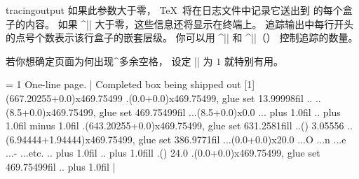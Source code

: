 \begindesc
\cts tracingoutput {}
\explain
如果此参数大于零，
\TeX\ 将在日志文件中记录它送出到 \dvifile 的每个盒子的内容。
如果 ^|\tracingonline| 大于零，这些信息还将显示在终端上。
追踪输出中每行开头的点号个数表示该行盒子的嵌套层级。
你可以用 ^|\showboxbreadth| 和 ^|\showboxdepth|（\xref\showboxbreadth ）%
控制追踪的数量。

若你想确定页面为何出现^{多余空格}，
设定 |\tracingoutput| 为 $1$ 就特别有用。

\example
\tracingoutput = 1 \nopagenumbers
One-line page. \bye
|
\logproduces
Completed box being shipped out [1]
\vbox(667.20255+0.0)x469.75499
.\vbox(0.0+0.0)x469.75499, glue set 13.99998fil
..
..\hbox(8.5+0.0)x469.75499, glue set 469.75499fil
...\vbox(8.5+0.0)x0.0
... plus 1.0fil
.. plus 1.0fil minus 1.0fil
.\vbox(643.20255+0.0)x469.75499, glue set 631.2581fill
..\glue(\topskip) 3.05556
..\hbox(6.94444+1.94444)x469.75499, glue set 386.9771fil
...\hbox(0.0+0.0)x20.0
...\tenrm O
...\tenrm n
...\tenrm e
...\tenrm -
...etc.
.. plus 1.0fil
.. plus 1.0fill
.\glue(\baselineskip) 24.0
.\hbox(0.0+0.0)x469.75499, glue set 469.75499fil
.. plus 1.0fil
|
\endexample
\enddesc

